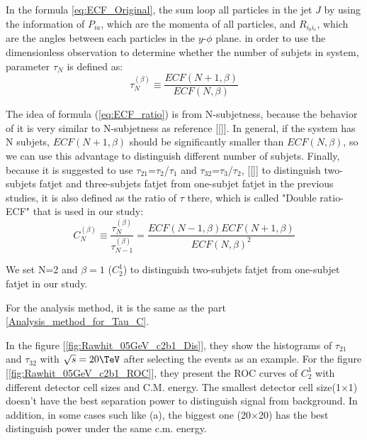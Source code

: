 \documentclass[12pt,twoside,a4paper,an,final]{cms-tdr}
\begin{document}
In the formula \ref{eq:ECF_Original}, the sum loop all particles in the jet $J$ by using the information of $P_{ia}$, which are the momenta of all particles, and $R_{i_{b}i_{c}}$, which are the angles between each particles in the $y$-$\phi$ plane.  in order to use the dimensionless observation to determine whether the number of subjets in system, parameter $\tau_{N}$ is defined as:\\
\begin{equation} \label{eq:ECF_ratio}
\tau_{N}^{(\beta)}\equiv\frac{ECF(N+1,\beta)}{ECF(N,\beta)}
\end{equation}

The idea of formula (\ref{eq:ECF_ratio}) is from N-subjetness, because the behavior of it is very similar to N-subjetness as reference [\ref{}]. In general, if the system has N subjets, $ECF(N+1,\beta)$ should be significantly smaller than $ECF(N,\beta)$, so we can use this advantage to distinguish different number of subjets. Finally, because it is suggested to use $\tau_{21}$=$\tau_{2}$/$\tau_{1}$  and $\tau_{32}$=$\tau_{3}$/$\tau_{2}$, [\ref{}] to distinguish two-subjets fatjet and three-subjets fatjet from one-subjet fatjet in the previous studies, it is also defined as the ratio of $\tau$ there, which is called "Double ratio-ECF" that is used in our study:\\
\begin{equation}
C_{N}^{(\beta)}\equiv\frac{\tau_{N}^{(\beta)}}{\tau_{N-1}^{(\beta)}}=\frac{ECF(N-1,\beta)ECF(N+1,\beta)}{ECF(N,\beta)^2}
\end{equation}

We set N=2 and $\beta=1$ ($C_{2}^{1}$) to distinguish two-subjets fatjet from one-subjet fatjet in our study.

For the analysis method, it is the same as the part \ref{Analysis_method_for_Tau_C}.

In the figure [\ref{fig:Rawhit_05GeV_c2b1_Dis}], they show the histograms of $\tau_{21}$ and $\tau_{32}$ with $\sqrt{s} = 20\TeV$ after selecting the events as an example. For the figure [\ref{fig:Rawhit_05GeV_c2b1_ROC}], they present the ROC curves of $C_{2}^{1}$ with different detector cell sizes and C.M. energy. The smallest detector cell size(1$\times$1) doesn't have the best separation power to distinguish signal from background. In addition, in some cases such like (a), the biggest one (20$\times$20) has the best distinguish power under the same c.m. energy.\\
\end{document}
